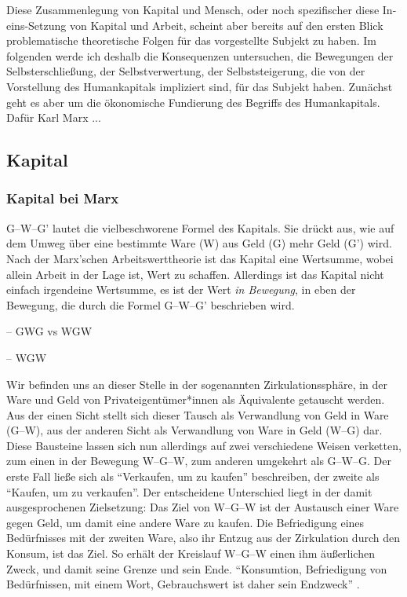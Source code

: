\documentclass[12pt,
               DIV13,
               paper=a4,
               twoside=false,
               onehalfspacing,
               bibliography=totoc,
               toc=graduated,
               draft,
               ]{scrartcl}
\newcommand{\pc}[2]{\parencite[#1]{#2}}
\newcommand{\worries}[1]{\ifdraft{\textcolor{blue}{\texttt{(#1)}}}{}}
\newcommand{\gwg}{G--W--G'\xspace}
\newcommand{\wgw}{W--G--W\xspace}
\begin{document}
Diese Zusammenlegung von Kapital und Mensch, oder noch spezifischer
diese In-eins-Set\-zung von Kapital und Arbeit, scheint aber bereits
auf den ersten Blick problematische theoretische \worries{und
praktische?} Folgen für das vorgestellte Subjekt zu haben. Im
folgenden werde ich deshalb die Konsequenzen untersuchen, die
Bewegungen der Selbsterschließung, der Selbstverwertung, der
Selbststeigerung, die von der Vorstellung des Humankapitals impliziert
sind, für das Subjekt haben. Zunächst geht es aber um die ökonomische
Fundierung des Begriffs des Humankapitals. Dafür Karl Marx ...

\worries{Warum Marx?}

\subsection{Kapital}

\subsubsection{Kapital bei Marx}

\gwg lautet die vielbeschworene Formel des Kapitals. Sie drückt aus, wie
auf dem Umweg über eine bestimmte Ware (W) aus Geld (G) mehr Geld (G')
wird. Nach der Marx'schen Arbeitswerttheorie ist das Kapital eine
Wertsumme, wobei allein Arbeit in der Lage ist, Wert zu schaffen.
Allerdings ist das Kapital nicht einfach irgendeine Wertsumme, es ist
der Wert \emph{in Bewegung}, in eben der Bewegung, die durch die
Formel \gwg beschrieben wird.

-- GWG vs WGW

-- WGW

Wir befinden uns an dieser Stelle in der sogenannten
Zirkulationssphäre, in der Ware und Geld von Privateigentümer*innen
als Äquivalente getauscht werden. Aus der einen Sicht stellt sich
dieser Tausch als Verwandlung von Geld in Ware (G--W), aus der anderen
Sicht als Verwandlung von Ware in Geld (W--G) dar. Diese Bausteine
lassen sich nun allerdings auf zwei verschiedene Weisen verketten, zum
einen in der Bewegung \wgw, zum anderen umgekehrt als G--W--G. Der
erste Fall ließe sich als "`Verkaufen, um zu kaufen"' beschreiben, der
zweite als "`Kaufen, um zu verkaufen"'. Der entscheidene Unterschied
liegt in der damit ausgesprochenen Zielsetzung: Das Ziel von \wgw ist
der Austausch einer Ware gegen Geld, um damit eine andere Ware zu
kaufen.
Die Befriedigung eines Bedürfnisses mit der zweiten Ware, also ihr
Entzug aus der Zirkulation durch den Konsum, ist das Ziel. So erhält
der Kreislauf \wgw einen ihm äußerlichen Zweck, und damit seine Grenze
und sein Ende. "`Konsumtion, Befriedigung von Bedürfnissen, mit einem
Wort, Gebrauchswert ist daher sein Endzweck"' \pc{164}{kap}.
\end{document}
